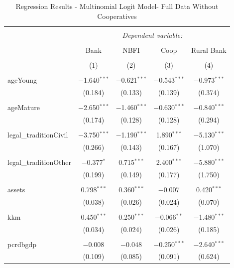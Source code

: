 \documentclass[a4paper, nobind]{templates/ociamthesis}
\begin{document}
\begin{table}[!htbp] \centering 
  \caption{Regression Results - Multinomial Logit Model- Full Data Without Cooperatives} 
  \label{} 
\footnotesize 
\begin{tabular}{@{\extracolsep{5pt}}lcccc} 
\\[-1.8ex]\hline 
\hline \\[-1.8ex] 
 & \multicolumn{4}{c}{\textit{Dependent variable:}} \\ 
\cline{2-5} 
\\[-1.8ex] & Bank & NBFI & Coop & Rural Bank \\ 
\\[-1.8ex] & (1) & (2) & (3) & (4)\\ 
\hline \\[-1.8ex] 
 ageYoung & $-$1.640$^{***}$ & $-$0.621$^{***}$ & $-$0.543$^{***}$ & $-$0.973$^{***}$ \\ 
  & (0.184) & (0.133) & (0.139) & (0.374) \\ 
  & & & & \\ 
 ageMature & $-$2.650$^{***}$ & $-$1.460$^{***}$ & $-$0.630$^{***}$ & $-$0.840$^{***}$ \\ 
  & (0.174) & (0.128) & (0.128) & (0.294) \\ 
  & & & & \\ 
 legal\_traditionCivil & $-$3.750$^{***}$ & $-$1.190$^{***}$ & 1.890$^{***}$ & $-$5.130$^{***}$ \\ 
  & (0.266) & (0.143) & (0.167) & (1.070) \\ 
  & & & & \\ 
 legal\_traditionOther & $-$0.377$^{*}$ & 0.715$^{***}$ & 2.400$^{***}$ & $-$5.880$^{***}$ \\ 
  & (0.199) & (0.149) & (0.177) & (1.750) \\ 
  & & & & \\ 
 assets & 0.798$^{***}$ & 0.360$^{***}$ & $-$0.007 & 0.420$^{***}$ \\ 
  & (0.038) & (0.026) & (0.024) & (0.070) \\ 
  & & & & \\ 
 kkm & 0.450$^{***}$ & 0.250$^{***}$ & $-$0.066$^{**}$ & $-$1.480$^{***}$ \\ 
  & (0.034) & (0.024) & (0.026) & (0.185) \\ 
  & & & & \\ 
 pcrdbgdp & $-$0.008 & $-$0.048 & $-$0.250$^{***}$ & $-$2.640$^{***}$ \\ 
  & (0.109) & (0.085) & (0.091) & (0.624) \\ 

\end{tabular}
\end{table}
\end{document}
